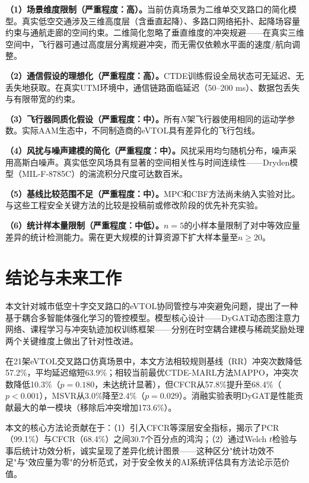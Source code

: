 \documentclass[12pt,a4paper,UTF8]{ctexart}
\begin{document}
\textbf{（1）场景维度限制（严重程度：高）。}当前仿真场景为二维单交叉路口的简化模型。真实低空交通涉及三维高度层（含垂直起降）、多路口网络拓扑、起降场容量约束与通航走廊的空间约束。二维简化忽略了垂直维度的冲突规避——在真实三维空间中，飞行器可通过高度层分离规避冲突，而无需仅依赖水平面的速度/航向调整。

\textbf{（2）通信假设的理想化（严重程度：高）。}CTDE训练假设全局状态可无延迟、无丢失地获取。在真实UTM环境中，通信链路面临延迟（50--200 ms）、数据包丢失与有限带宽的约束。

\textbf{（3）飞行器同质化假设（严重程度：中）。}所有$N$架飞行器使用相同的运动学参数。实际AAM生态中，不同制造商的eVTOL具有差异化的飞行包线。

\textbf{（4）风扰与噪声建模的简化（严重程度：中）。}风扰采用均匀随机分布，噪声采用高斯白噪声。真实低空风场具有显著的空间相关性与时间连续性——Dryden模型（MIL-F-8785C）\cite{ref20}的湍流积分尺度可达数百米。

\textbf{（5）基线比较范围不足（严重程度：中）。}MPC和CBF方法尚未纳入实验对比。与这些工程安全关键方法的比较是投稿前或修改阶段的优先补充实验。

\textbf{（6）统计样本量限制（严重程度：中低）。}$n=5$的小样本量限制了对中等效应量差异的统计检测能力。需在更大规模的计算资源下扩大样本量至$n \geq 20$。

\section{结论与未来工作}

本文针对城市低空十字交叉路口的eVTOL协同管控与冲突避免问题，提出了一种基于耦合多智能体强化学习的管控模型。模型核心设计——DyGAT动态图注意力网络、课程学习与冲突轨迹加权训练框架——分别在时空耦合建模与稀疏奖励处理两个关键维度上做出了针对性改进。

在21架eVTOL交叉路口仿真场景中，本文方法相较规则基线（RR）冲突次数降低57.2\%，平均延迟缩短63.9\%；相较当前最优CTDE-MARL方法MAPPO，冲突次数降低10.3\%（$p=0.180$，未达统计显著），但CFCR从57.8\%提升至68.4\%（$p<0.001$），MSVR从3.0\%降至2.4\%（$p=0.029$）。消融实验表明DyGAT是性能贡献最大的单一模块（移除后冲突增加173.6\%）。

本文的核心方法论贡献在于：（1）引入CFCR等深层安全指标，揭示了PCR（99.1\%）与CFCR（68.4\%）之间30.7个百分点的鸿沟；（2）通过Welch $t$检验与事后统计功效分析，诚实呈现了差异化统计图景——这种区分"统计功效不足"与"效应量为零"的分析范式，对于安全攸关的AI系统评估具有方法论示范价值。
\end{document}

